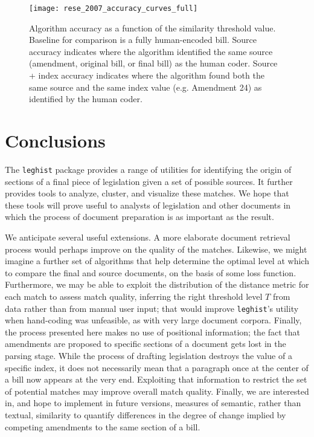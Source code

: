 \documentclass[11pt]{article}
\begin{document}
\begin{figure}[ht]
  \centering
  \texttt{[image: rese\_2007\_accuracy\_curves\_full]}
  \caption{Algorithm accuracy as a function of the similarity threshold value. Baseline for comparison is a fully human-encoded bill. Source accuracy indicates where the algorithm identified the same source (amendment, original bill, or final bill) as the human coder. Source + index accuracy indicates where the algorithm found both the same source and the same index value (e.g. Amendment 24) as identified by the human coder.  }
  \label{fig:rese-accuracy-test}
\end{figure}


\section{Conclusions}
\label{sec:conclusions}

The \texttt{leghist} package provides a range of utilities for
identifying the origin of sections of a final piece of legislation
given a set of possible sources. It further provides tools to analyze,
cluster, and visualize these matches. We hope that these tools will
prove useful to analysts of legislation and other documents in which
the process of document preparation is as important as the result. 

We anticipate several useful extensions. A more elaborate document
retrieval process would perhaps improve on the quality of the
matches. Likewise, we might imagine a further set of algorithms that
help determine the optimal level at which to compare the final and
source documents, on the basis of some loss function. Furthermore, we
may be able to exploit the distribution of the distance metric for
each match to assess match quality, inferring the right threshold level
$T$ from data rather than from manual user input; that would improve
\texttt{leghist}'s utility when hand-coding was unfeasible, as with
very large document corpora. Finally, the
process presented here makes no use of positional information; the
fact that amendments are proposed to specific sections of a document
gets lost in the parsing stage. While the process of drafting
legislation destroys the value of a specific index, it does not
necessarily mean that a paragraph once at the center of a bill now
appears at the very end. Exploiting that information to restrict the
set of potential matches may improve overall match quality. Finally,
we are interested in, and hope to implement in future versions,
measures of semantic, rather than textual, similarity to quantify
differences in the degree of change implied by competing amendments to
the same section of a bill. 





\end{document}
